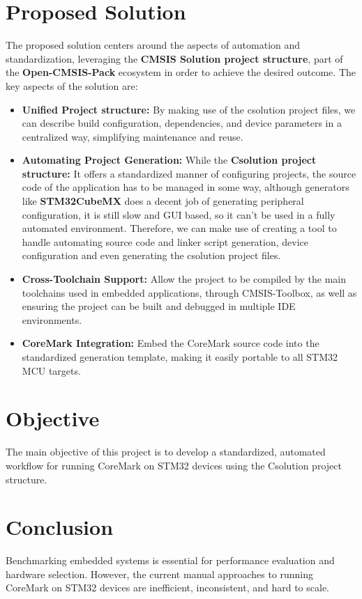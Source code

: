 \section{Proposed Solution}
The proposed solution centers around the aspects of automation and standardization, leveraging the \textbf{CMSIS Solution project structure}, part of the \textbf{Open-CMSIS-Pack} ecosystem in order to achieve the desired outcome.
The key aspects of the solution are:
\begin{itemize}
  \item \textbf{Unified Project structure:}
  By making use of the csolution project files, we can describe build configuration, dependencies, and device parameters in a centralized way, simplifying maintenance and reuse.
  \item \textbf{Automating Project Generation:}
  While the \textbf{Csolution project structure:} It offers a standardized manner of configuring projects, the source code of the application has to be managed in some way, although generators like \textbf{STM32CubeMX} does a decent job of generating peripheral configuration, it is still slow and GUI based, so it can't be used in a fully automated environment.
  Therefore, we can make use of creating a tool to handle automating source code and linker script generation, device configuration and even generating the csolution project files.
  \item \textbf{Cross-Toolchain Support:}
  Allow the project to be compiled by the main toolchains used in embedded applications, through CMSIS-Toolbox, as well as ensuring the project can be built and debugged in multiple IDE environments.
  \item \textbf{CoreMark Integration:}
  Embed the CoreMark source code into the standardized generation template, making it easily portable to all STM32 MCU targets.
\end{itemize}

\section{Objective}
The main objective of this project is to develop a standardized, automated workflow for running CoreMark on STM32 devices using the Csolution project structure.

\section{Conclusion}
Benchmarking embedded systems is essential for performance evaluation and hardware selection. However, the current manual approaches to running CoreMark on STM32 devices are inefficient, inconsistent, and hard to scale.

